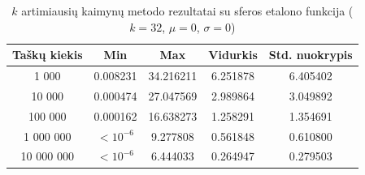 \begin{table}[H]
    \centering
    \begin{tabular}{|c|c|c|c|c|}
        \hline
        \textbf{Taškų kiekis} & \textbf{Min} & \textbf{Max} & \textbf{Vidurkis} & \textbf{Std. nuokrypis} \\ \hline
        1 000        & 0.008231 & 34.216211 & 6.251878 & 6.405402 \\ \hline
        10 000       & 0.000474 & 27.047569 & 2.989864 & 3.049892 \\ \hline
        100 000      & 0.000162 & 16.638273 & 1.258291 & 1.354691 \\ \hline
        1 000 000    & $<10^{-6}$ & 9.277808 & 0.561848 & 0.610800 \\ \hline
        10 000 000   & $<10^{-6}$ & 6.444033 & 0.264947 & 0.279503 \\ \hline
    \end{tabular}
    \caption{$k$ artimiausių kaimynų metodo rezultatai su sferos etalono funkcija ($k = 32$, $\mu = 0$, $\sigma = 0$)}
\end{table}